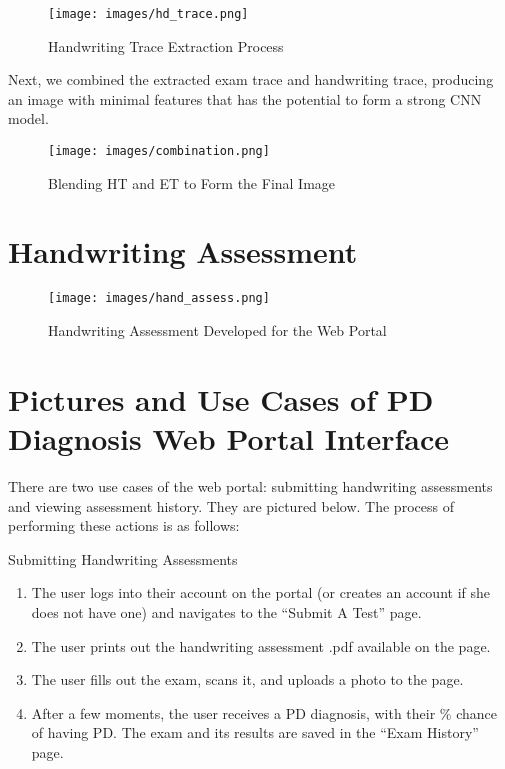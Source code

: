 \documentclass[pmlr,twocolumn,10pt]{jmlr} %
\begin{document}
\begin{figure}[h] 
\label{fig: fig3}
\centering 
\texttt{[image: images/hd\_trace.png]}
\caption{Handwriting Trace Extraction Process}
\end{figure}

\clearpage

Next, we combined the extracted exam trace and handwriting trace, producing an image with minimal features that has the potential to form a strong CNN model.

\begin{figure} [h]
\label{fig:fig4}
\centering 
\texttt{[image: images/combination.png]}
\caption{Blending HT and ET to Form the Final Image}
\end{figure}

\clearpage

\section{Handwriting Assessment}
\label{app:assessment}

\begin{figure} [h]
\label{fig:fig5}
\centering 
\texttt{[image: images/hand\_assess.png]}
\caption{Handwriting Assessment Developed for the Web Portal}
\end{figure}

\clearpage

\section{Pictures and Use Cases of PD Diagnosis Web Portal Interface} 

There are two use cases of the web portal: submitting handwriting assessments and viewing assessment history. They are pictured below. The process of performing these actions is as follows:

Submitting Handwriting Assessments

\begin{enumerate}
\item The user logs into their account on the portal (or creates an account if she does not have one) and navigates to the “Submit A Test” page.
\item The user prints out the handwriting assessment .pdf available on the page.
\item 
The user fills out the exam, scans it, and uploads a photo to the page.
\item After a few moments, the user receives a PD diagnosis, with their \% chance of having PD. The exam and its results are saved in the “Exam History” page.
\end{enumerate}
\end{document}
